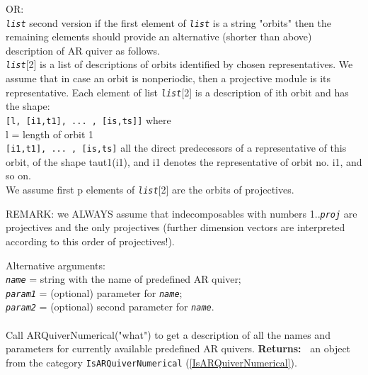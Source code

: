 \documentclass[a4paper,11pt]{report}
\begin{document}
{{{ OR:\\
 \mbox{\texttt{\mdseries\slshape list}} second version \texttt{} if the first element of \mbox{\texttt{\mdseries\slshape list}} is a string "orbits" then the remaining elements should provide an alternative
(shorter than above) description of A\texttt{}R quiver as follows. \\
 \mbox{\texttt{\mdseries\slshape list}}[2] is a list of descriptions of orbits identified by chosen representatives.
We assume that in case an orbit is non\texttt{}periodic, then a
projective module is its representative. Each element of list \mbox{\texttt{\mdseries\slshape list}}[2] is a description of i\texttt{}th orbit and has the shape:\\
 \texttt{[l, [i1,t1], ... , [is,ts]]} where\\
 l = length of orbit \texttt{} 1\\
 \texttt{[i1,t1], ... , [is,ts]} all the direct predecessors of a representative of this orbit, of the shape
tau\texttt{}\texttt{}\texttt{}t1\texttt{}(i1),
and i1 denotes the representative of orbit no. i1, and so on.\\
 We assume first p elements of \mbox{\texttt{\mdseries\slshape list}}[2] are the orbits of projectives.

 REMARK: we ALWAYS assume that indecomposables with numbers 1..\mbox{\texttt{\mdseries\slshape proj}} are projectives and the only projectives (further dimension vectors are
interpreted according to this order of projectives!).

 Alternative arguments:\\
 \mbox{\texttt{\mdseries\slshape name}} = string with the name of predefined A\texttt{}R quiver;\\
 \mbox{\texttt{\mdseries\slshape param1}} = (optional) parameter for \mbox{\texttt{\mdseries\slshape name}};\\
 \mbox{\texttt{\mdseries\slshape param2}} = (optional) second parameter for \mbox{\texttt{\mdseries\slshape name}}.\\
 \\
 Call ARQuiverNumerical("what") to get a description of all the names and
parameters for currently available predefined A\texttt{}R quivers. \textbf{\indent Returns:\ }
an object from the category \texttt{IsARQuiverNumerical} (\ref{IsARQuiverNumerical}).



}}}
\end{document}
